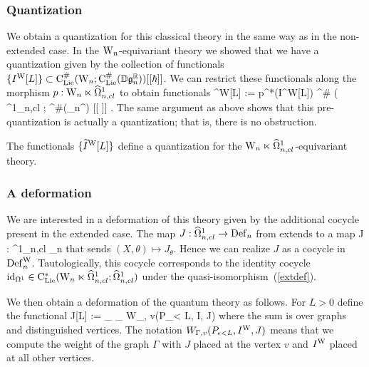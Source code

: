 \subsubsection{Quantization} 

We obtain a quantization for this classical theory in the same way as
in the non-extended case. In the $\Vect$-equivariant theory we showed
that we have a quantization given by the collection of functionals
$\{I^{\rm W}  [L]\} \subset \clie^\# (\Vect ; \clie^\#(\DD \fg_n^\RR))
[[ \hbar ]]$. We can restrict these functionals along the morphism
$p : \Vect \ltimes \hOmega^1_{n,cl}$ to obtain functionals
\ben
{}^{\rm W}[L] := p^*(I^{\rm W}[L]) \in \clie^\# (\Vect 
\ltimes \hOmega^1_{n,cl} ; \clie^\#(\DD \fg_n^\RR) [[ \hbar ]] .
\een 
The same argument as above shows that this pre-quantization is
actually a quantization; that is, there is no obstruction. 

\begin{prop} The functionals $\{\Tilde{I}^{\rm W}[L]\}$ define a
  quantization for the $\Vect \ltimes \hOmega^1_{n,cl}$-equivariant
  theory.
\end{prop}

\subsubsection{A deformation}

We are interested in a deformation of this theory given by the
additional cocycle present in the extended case. The map $J :
\hOmega^1_{n,cl} \to \Def_n$ from  extends to a map
\ben
J : \Vect \ltimes \hOmega^1_{n,cl} \to \Def_n
\een
that sends $(X,\theta) \mapsto J_\theta$. Hence we can realize $J$
as a cocycle in $\Def_n^{\rm W}$. Tautologically, this cocycle corresponds to
the identity cocycle $\id_{\Omega^1} \in \clie^*(\Vect \ltimes
\hOmega^1_{n,cl} ; \hOmega^1_{n,cl})$ under the quasi-isomorphism~(\ref{extdef}). 

We then obtain a deformation of the quantum theory as follows. For $L > 0$
define the functional 
\ben
J[L] := \lim_{\epsilon {}} \sum_{} W_{\Gamma, v}(P_{\epsilon <
  L}, I, J)
\een
where the sum is over graphs and distinguished vertices. The notation $W_{\Gamma, v}(P_{\epsilon <
  L}, I^{\rm W}, J)$ means that we compute the weight of the graph $\Gamma$
with $J$ placed at the vertex $v$ and $I^{\rm W}$ placed at all other
vertices. 

